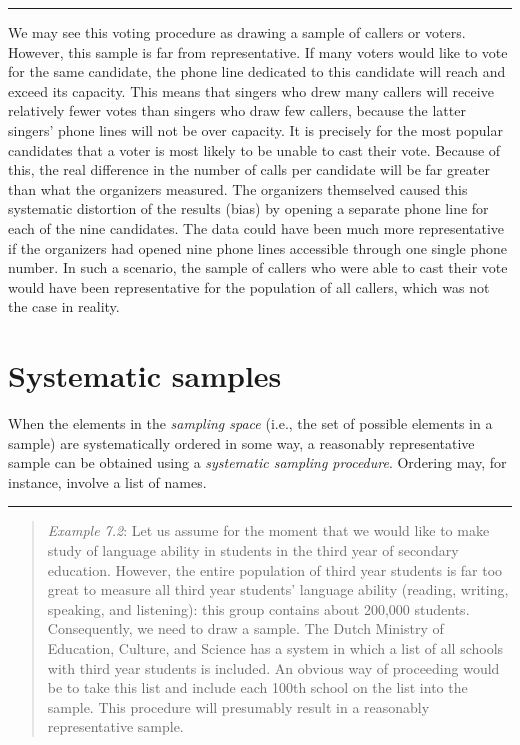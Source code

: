 \documentclass[
]{book}
\begin{document}
\begin{center}\rule{0.5\linewidth}{0.5pt}\end{center}

We may see this voting procedure as drawing a sample of callers or voters. However, this sample is far from representative. If many voters would like to vote for the same candidate, the phone line dedicated to this candidate will reach and exceed its capacity. This means that singers who drew many callers will receive relatively fewer votes than singers who draw few callers, because the latter singers' phone lines will not be over capacity. It is precisely for the most popular candidates that a voter is most likely to be unable to cast their vote. Because of this, the real difference in the number of calls per candidate will be far greater than what the organizers measured. The organizers themselved caused this systematic distortion of the results (bias) by opening a separate phone line for each of the nine candidates. The data could have been much more representative if the organizers had opened nine phone lines accessible through one single phone number. In such a scenario, the sample of callers who were able to cast their vote would have been representative for the population of all callers, which was not the case in reality.

\hypertarget{sec:systematic-samples}{%
\section{Systematic samples}\label{sec:systematic-samples}}

When the elements in the \emph{sampling space} (i.e., the set of possible elements in a sample) are systematically ordered in some way, a reasonably representative sample can be obtained using a \emph{systematic sampling procedure}. Ordering may, for instance, involve a list of names.

\begin{center}\rule{0.5\linewidth}{0.5pt}\end{center}

\begin{quote}
\emph{Example 7.2}: Let us assume for the moment that we would like to make study of language ability in students in the third year of secondary education. However, the entire population of third year students is far too great to measure all third year students' language ability (reading, writing, speaking, and listening): this group contains about 200,000 students. Consequently, we need to draw a sample. The Dutch Ministry of Education, Culture, and Science has a system in which a list of all schools with third year students is included. An obvious way of proceeding would be to take this list and include each 100th school on the list into the sample. This procedure will presumably result in a reasonably representative sample.
\end{quote}
\end{document}
